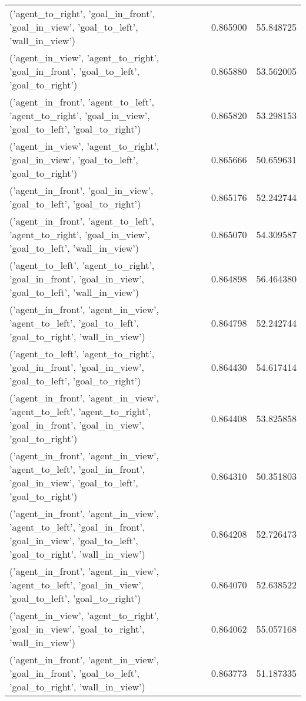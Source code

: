 \begin{tabular}{lrr}
('agent\_to\_right', 'goal\_in\_front', 'goal\_in\_view', 'goal\_to\_left', 'wall\_in\_view') & 0.865900 & 55.848725 \\
('agent\_in\_view', 'agent\_to\_right', 'goal\_in\_front', 'goal\_to\_left', 'goal\_to\_right') & 0.865880 & 53.562005 \\
('agent\_in\_front', 'agent\_to\_left', 'agent\_to\_right', 'goal\_in\_view', 'goal\_to\_left', 'goal\_to\_right') & 0.865820 & 53.298153 \\
('agent\_in\_view', 'agent\_to\_right', 'goal\_in\_view', 'goal\_to\_left', 'goal\_to\_right') & 0.865666 & 50.659631 \\
('agent\_in\_front', 'goal\_in\_view', 'goal\_to\_left', 'goal\_to\_right') & 0.865176 & 52.242744 \\
('agent\_in\_front', 'agent\_to\_left', 'agent\_to\_right', 'goal\_in\_view', 'goal\_to\_left', 'wall\_in\_view') & 0.865070 & 54.309587 \\
('agent\_to\_left', 'agent\_to\_right', 'goal\_in\_front', 'goal\_in\_view', 'goal\_to\_left', 'wall\_in\_view') & 0.864898 & 56.464380 \\
('agent\_in\_front', 'agent\_in\_view', 'agent\_to\_left', 'goal\_to\_left', 'goal\_to\_right', 'wall\_in\_view') & 0.864798 & 52.242744 \\
('agent\_to\_left', 'agent\_to\_right', 'goal\_in\_front', 'goal\_in\_view', 'goal\_to\_left', 'goal\_to\_right') & 0.864430 & 54.617414 \\
('agent\_in\_front', 'agent\_in\_view', 'agent\_to\_left', 'agent\_to\_right', 'goal\_in\_front', 'goal\_in\_view', 'goal\_to\_right') & 0.864408 & 53.825858 \\
('agent\_in\_front', 'agent\_in\_view', 'agent\_to\_left', 'goal\_in\_front', 'goal\_in\_view', 'goal\_to\_left', 'goal\_to\_right') & 0.864310 & 50.351803 \\
('agent\_in\_front', 'agent\_in\_view', 'agent\_to\_left', 'goal\_in\_front', 'goal\_in\_view', 'goal\_to\_left', 'goal\_to\_right', 'wall\_in\_view') & 0.864208 & 52.726473 \\
('agent\_in\_front', 'agent\_in\_view', 'agent\_to\_left', 'goal\_in\_view', 'goal\_to\_left', 'goal\_to\_right') & 0.864070 & 52.638522 \\
('agent\_in\_view', 'agent\_to\_right', 'goal\_in\_view', 'goal\_to\_right', 'wall\_in\_view') & 0.864062 & 55.057168 \\
('agent\_in\_front', 'agent\_in\_view', 'goal\_in\_front', 'goal\_to\_left', 'goal\_to\_right', 'wall\_in\_view') & 0.863773 & 51.187335 \\

\end{tabular}
